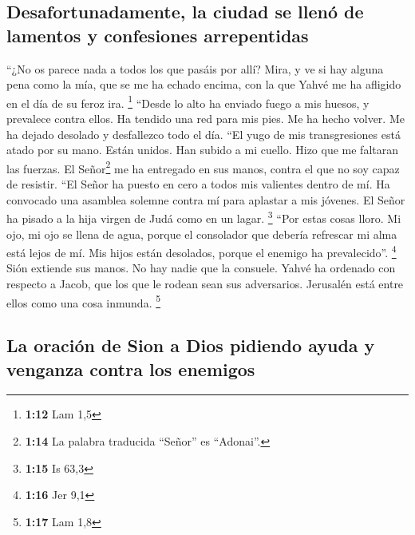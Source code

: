\begin{paracol}{2}
\hypertarget{desafortunadamente-la-ciudad-se-llenuxf3-de-lamentos-y-confesiones-arrepentidas}{%
\subsection{Desafortunadamente, la ciudad se llenó de lamentos y
confesiones
arrepentidas}\label{desafortunadamente-la-ciudad-se-llenuxf3-de-lamentos-y-confesiones-arrepentidas}}

 ``¿No os parece nada a todos los que pasáis por allí?
Mira, y ve si hay alguna pena como la mía, que se me ha echado encima,
con la que Yahvé me ha afligido en el día de su feroz ira. \footnote{\textbf{1:12}
  Lam 1,5}  ``Desde lo alto ha enviado fuego a mis
huesos, y prevalece contra ellos. Ha tendido una red para mis pies. Me
ha hecho volver. Me ha dejado desolado y desfallezco todo el día.
 ``El yugo de mis transgresiones está atado por su mano.
Están unidos. Han subido a mi cuello. Hizo que me faltaran las fuerzas.
El Señor\footnote{\textbf{1:14} La palabra traducida ``Señor'' es
  ``Adonai''.} me ha entregado en sus manos, contra el que no soy capaz
de resistir.  ``El Señor ha puesto en cero a todos mis
valientes dentro de mí. Ha convocado una asamblea solemne contra mí para
aplastar a mis jóvenes. El Señor ha pisado a la hija virgen de Judá como
en un lagar. \footnote{\textbf{1:15} Is 63,3}  ``Por
estas cosas lloro. Mi ojo, mi ojo se llena de agua, porque el consolador
que debería refrescar mi alma está lejos de mí. Mis hijos están
desolados, porque el enemigo ha prevalecido''. \footnote{\textbf{1:16}
  Jer 9,1}  Sión extiende sus manos. No hay nadie que la
consuele. Yahvé ha ordenado con respecto a Jacob, que los que le rodean
sean sus adversarios. Jerusalén está entre ellos como una cosa inmunda.
\footnote{\textbf{1:17} Lam 1,8}

\hypertarget{la-oraciuxf3n-de-sion-a-dios-pidiendo-ayuda-y-venganza-contra-los-enemigos}{%
\subsection{La oración de Sion a Dios pidiendo ayuda y venganza contra
los
enemigos}\label{la-oraciuxf3n-de-sion-a-dios-pidiendo-ayuda-y-venganza-contra-los-enemigos}}


\end{paracol}
